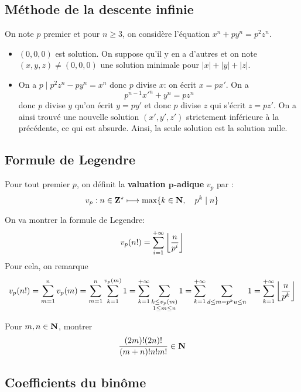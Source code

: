 \subsection{Méthode de la descente infinie}

On note $p$ premier et pour $n\geq 3$, on considère l'équation $x^n+py^n=p^2z^n$.
\begin{itemize}
    \item $(0, 0, 0)$ est solution. On suppose qu'il y en a d'autres et on note $(x, y, z)\neq (0, 0, 0)$ une solution minimale pour $|x|+|y|+|z|$.
    \item On a $p\;|\;p^2z^n-py^n=x^n$ donc $p$ divise $x$: on écrit $x=px'$. On a \[
            p^{n-1}x'^n+y^n=pz^n
        \]
        donc $p$ divise $y$ qu'on écrit $y=py'$ et donc $p$ divise $z$ qui s'écrit $z=pz'$. On a ainsi trouvé une nouvelle solution $(x', y', z')$ strictement inférieure à la précédente, ce qui est absurde. Ainsi, la seule solution est la solution nulle.
\end{itemize}

\subsection{Formule de Legendre}

\begin{dfn}
     Pour tout premier $p$, on définit la \textbf{valuation $\bm p$-adique} $v_p$ par : \[
        v_p: n\in\mathbf Z^\star \longmapsto \max\{k\in\mathbf N, \quad p^k\;|\; n\}
    \]
\end{dfn}

On va montrer la formule de Legendre: \[
    v_p(n!)=\sum_{i=1}^{+\infty}\left\lfloor\frac n{p^i}\right\rfloor
\]
Pour cela, on remarque \[
    v_p(n!)=\sum_{m=1}^nv_p(m)=\sum_{m=1}^n\sum_{k=1}^{v_p(m)}1=\sum_{k=1}^{+\infty}\sum_{\substack{k\leq v_p(m)\\ 1\leq m\leq n}}1=\sum_{k=1}^{+\infty}\sum_{d\leq m=p^ku\leq n}1=\sum_{k=1}^{+\infty}\left\lfloor\frac n{p^k}\right\rfloor
\]

\begin{exo}[X]
     Pour $m, n\in\mathbf N$, montrer \[
        \frac{(2m)!(2n)!}{(m+n)!n!m!}\in\mathbf N
     \]
\end{exo}

\subsection{Coefficients du binôme}

